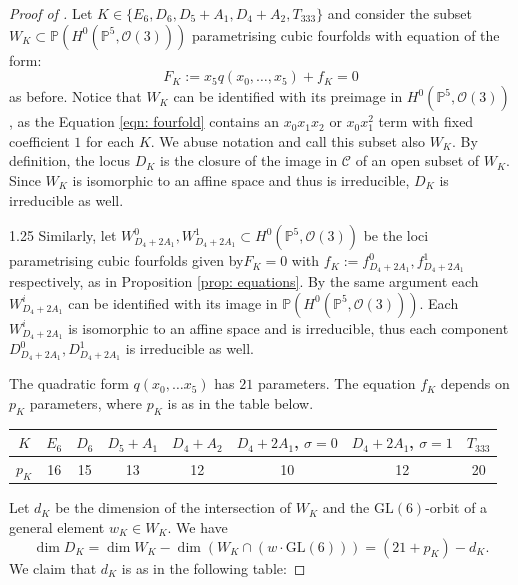 \documentclass[12pt]{amsart}
\numberwithin{equation}{section}
\theoremstyle{plain}
\theoremstyle{remark}
\theoremstyle{definition}
\newcommand{\bP}{\mathbb{P}}
\newcommand{\calC}{\mathcal{C}}
\newcommand{\calO}{\mathcal{O}}
\newcommand{\GL}{\mathrm{GL}}
\begin{document}
\begin{proof}[Proof of ]
    Let  $K\in\{E_6, D_6, D_5+A_1, D_4+A_2, T_{333}\}$ and consider the subset $W_K\subset \bP(H^0(\bP^5, \calO(3)))$ parametrising cubic fourfolds with equation of the form:
    \begin{equation}
        F_K:=x_5q(x_0,\ldots,x_5)+f_K=0
    \end{equation}
    as before.
    Notice that $W_K$ can be identified with its preimage in $H^0(\bP^5, \calO(3))$, as the Equation \ref{eqn: fourfold} contains an $x_0x_1x_2$ or $x_0x_1^2$ term with fixed coefficient $1$ for each $K$. 
    We abuse notation and call this subset also $W_K$. 
    By definition, the locus $D_{K}$ is the closure of the image in $\calC$ of an open subset of $W_K$. 
    Since $W_K$ is isomorphic to an affine space and thus is irreducible, $D_{K}$ is irreducible as well.

    \begin{spacing}{1.25}
    Similarly, let $W_{D_4+2A_1}^0,W_{D_4+2A_1}^1\subset H^0(\bP^5, \calO(3))$ be the loci parametrising cubic fourfolds given by$F_K=0$ with $f_K:=f^0_{D_4+2A_1},f^1_{D_4+2A_1}$ respectively, as in Proposition \ref{prop: equations}. 
    By the same argument each $W_{D_4+2A_1}^i$ can be identified with its image in $\bP(H^0(\bP^5,\calO(3)))$. 
    Each $W_{D_4+2A_1}^i$ is isomorphic to an affine space and is irreducible, thus each component $D_{D_4+2A_1}^0, D_{D_4+2A_1}^1$ is irreducible as well.
  \end{spacing}
  
    The quadratic form $q(x_0,\dots x_5)$ has $21$ parameters. The equation $f_K$ depends on $p_K$ parameters, where $p_K$ is as in the table below.

\begin{table}[h!]
\centering
\begin{tabular}{c|c|c|c|c|c|c|c}

$K$ & $E_6$ & $D_6$ & $D_5+A_1$& $D_4+A_2$ & $D_4+2A_1$, $\sigma=0$ & $D_4+2A_1$, $\sigma=1$ & $T_{333}$ \\ \hline
$p_K$   & 16   & 15   & 13   & 12  & 10  & 12 & 20 \\ 
\end{tabular}

\label{tab: parameter counts}
\end{table}
        
    Let $d_K$ be the dimension of the intersection of $W_K$ and the $\GL(6)$-orbit of a general element $w_K\in W_K$. 
    We have 
    \begin{equation}\label{eqn: dimension}
        \dim D_K=\dim W_K-\dim(W_K\cap (w\cdot\GL(6)))=(21+p_K)-d_K.
    \end{equation}
    We claim that $d_K$ is as in the following table:


\end{proof}
\end{document}
